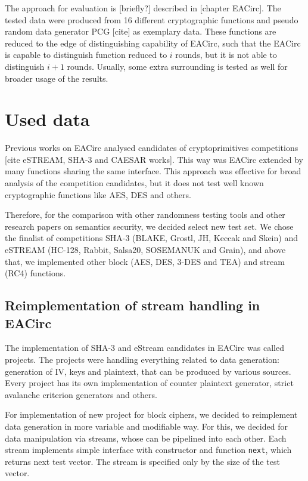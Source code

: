 \documentclass[
  print, %
  Table,   %
  nolof,     %
  nolot,     %
  draft, %
  11pt, %
  oneside  %
]{fithesis3}
\begin{document}
The approach for evaluation is [briefly?] described in [chapter EACirc]. The tested data were produced from 16 different cryptographic functions and pseudo random data generator PCG [cite] as exemplary data. These functions are reduced to the edge of distinguishing capability of EACirc, such that the EACirc is capable to distinguish function reduced to $i$ rounds, but it is not able to distinguish $i+1$ rounds. Usually, some extra surrounding is tested as well for broader usage of the results.

\section{Used data}

Previous works on EACirc analysed candidates of cryptoprimitives competitions [cite eSTREAM, SHA-3 and CAESAR works]. This way was EACirc extended by many functions sharing the same interface. This approach was effective for broad analysis of the competition candidates, but it does not test well known cryptographic functions like AES, DES and others.

Therefore, for the comparison with other randomness testing tools and other research papers on semantics security, we decided select new test set. We chose the finalist of competitions SHA-3 (BLAKE, Grostl, JH, Keccak and Skein) and eSTREAM (HC-128, Rabbit, Salsa20, SOSEMANUK and Grain), and above that, we implemented other block (AES, DES, 3-DES and TEA) and stream (RC4) functions.

\subsection{Reimplementation of stream handling in EACirc}

The implementation of SHA-3 and eStream candidates in EACirc was called projects. The projects were handling everything related to data generation: generation of IV, keys and plaintext, that can be produced by various sources. Every project has its own implementation of counter plaintext generator, strict avalanche criterion generators and others.

For implementation of new project for block ciphers, we decided to reimplement data generation in more variable and modifiable way. For this, we decided for data manipulation via streams, whose can be pipelined into each other. Each stream implements simple interface with constructor and function \texttt{next}, which returns next test vector. The stream is specified only by the size of the test vector.
\end{document}

